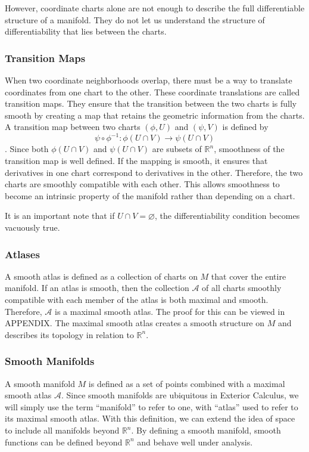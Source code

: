 \documentclass[12pt]{article}
\newcommand{\R}{\mathbb{R}}
\newcommand{\atlas}{\mathscr{A}}
\begin{document}
However, coordinate charts alone are not enough to describe the full differentiable structure of a manifold. They do not let us understand the structure of differentiability that lies between the charts.

\subsubsection{Transition Maps}
When two coordinate neighborhoods overlap, there must be a way to translate coordinates from one chart to the other. These coordinate translations are called transition maps. They ensure that the transition between the two charts is fully smooth by creating a map that retains the geometric information from the charts. A transition map between two charts $(\phi, U)$ and $(\psi, V)$ is defined by 
\[
 \psi \circ \phi^{-1}: \phi(U \cap V) \to \psi(U \cap V)
\].
Since both $\phi(U \cap V)$ and $\psi(U \cap V)$ are subsets of $\R^n$, smoothness of the transition map is well defined. If the mapping is smooth, it ensures that derivatives in one chart correspond to derivatives in the other. Therefore, the two charts are smoothly compatible with each other. This allows smoothness to become an intrinsic property of the manifold rather than depending on a chart.

It is an important note that if $U \cap V = \varnothing$, the differentiability condition becomes vacuously true. 

\subsubsection{Atlases}

A smooth atlas is defined as a collection of charts on $M$ that cover the entire manifold. If an atlas is smooth, then the collection $\atlas$ of all charts smoothly compatible with each member of the atlas is both maximal and smooth. Therefore, $\atlas$ is a maximal smooth atlas. The proof for this can be viewed in APPENDIX. The maximal smooth atlas creates a smooth structure on $M$ and describes its topology in relation to $\R^n$.

\subsubsection{Smooth Manifolds}

A smooth manifold $M$ is defined as a set of points combined with a maximal smooth atlas $\atlas$. Since smooth manifolds are ubiquitous in Exterior Calculus, we will simply use the term ``manifold'' to refer to one, with ``atlas'' used to refer to its maximal smooth atlas. With this definition, we can extend the idea of space to include all manifolds beyond $\R^n$. By defining a smooth manifold, smooth functions can be defined beyond $\R^n$ and behave well under analysis. 
\end{document}
